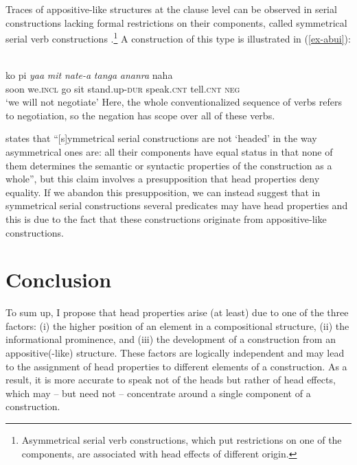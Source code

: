 \documentclass[output=paper
  ,nobabel
  ,draftmode
  ,colorlinks, citecolor=brown
]{langscibook}
\begin{document}
\noindent
Traces of appositive-like structures at the clause level can be observed in serial constructions
lacking formal restrictions on their components, called symmetrical serial verb constructions
\citep[3]{Aikhenvald2003}.\footnote{Asymmetrical serial verb constructions, which put restrictions
  on one of the components, are associated with head effects of different origin.}  A construction
of this type is illustrated in (\ref{ex-abui}): 

\ea\label{ex-abui} 
\\
\gll ko pi \emph{yaa} \emph{mit} \emph{nate-a} \emph{tanga} \emph{ananra} naha  \\ 
     soon    we.\textsc{incl}	  go	sit	stand.up-\textsc{dur}  speak.\textsc{cnt} tell.\textsc{cnt}	\textsc{neg} \\
\glt `we will not negotiate'
\z
Here, the whole conventionalized sequence of verbs
refers to negotiation, so the negation has scope over all of these verbs. 


\citet*[22]{Aikhenvald2006} states that ``[s]ymmetrical serial constructions are not `headed' in the way asymmetrical ones are: all their components have equal status in that none of them determines the semantic or syntactic properties of the construction as a whole'', but this claim involves a presupposition that head properties deny equality. If we abandon this presupposition, we can instead suggest that in symmetrical serial constructions several predicates may have head properties and this is due to the fact that these constructions originate from appositive-like constructions.

\section{Conclusion}\label{sec-conclu-lan}

To sum up, I propose that head properties arise (at least) due to one of the three factors: (i) the
higher position of an element in a compositional structure, (ii) the informational prominence, and
(iii) the development of a construction from an appositive(-like) structure. These factors are
logically independent and may lead to the assignment of head properties to different elements of a
construction. As a result, it is more accurate to speak not of the heads but rather of head effects,
which may – but need not – concentrate around a single component of a construction. 
\end{document}
